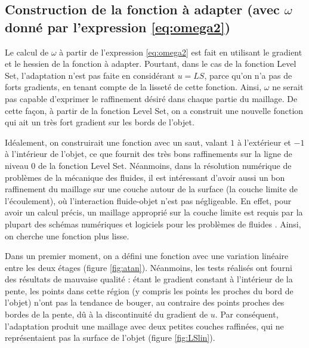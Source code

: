 \subsection{Construction de la fonction à adapter (avec \(\omega\) donné par l'expression \eqref{eq:omega2})}

\indent Le calcul de \(\omega\) à partir de l'expression \eqref{eq:omega2} est fait en utilisant le gradient et le hessien de la fonction à adapter. Pourtant, dans le cas de la fonction Level Set, l'adaptation n'est pas faite en considérant \(u=LS\), parce qu'on n'a pas de forts gradients, en tenant compte de la lisseté de cette fonction. Ainsi, \(\omega\) ne serait pas capable d'exprimer le raffinement désiré dans chaque partie du maillage. De cette façon, à partir de la fonction Level Set, on a construit une nouvelle fonction qui ait un très fort gradient sur les bords de l'objet.

\indent Idéalement, on construirait une fonction avec un saut, valant \(1\) à l'extérieur et \(-1\) à l'intérieur de l'objet, ce que fournit des très bons raffinements sur la ligne de niveau 0 de la fonction Level Set. Néanmoins, dans la résolution numérique de problèmes de la mécanique des fluides, il est intéressant d'avoir aussi un bon raffinement du maillage sur une couche autour de la surface (la couche limite de l'écoulement), où l'interaction fluide-objet n'est pas négligeable. En effet, pour avoir un calcul précis, un maillage approprié sur la couche limite est requis par la plupart des schémas numériques et logiciels pour les problèmes de fluides \cite{loseille}. Ainsi, on cherche une fonction plus lisse.

\indent Dans un premier moment, on a défini une fonction avec une variation linéaire entre les deux étages (figure \ref{fig:atan}). Néanmoins, les tests réalisés ont fourni des résultats de mauvaise qualité : étant le gradient constant à l'intérieur de la pente, les points dans cette région (y compris les points les proches du bord de l'objet) n'ont pas la tendance de bouger, au contraire des points proches des bordes de la pente, dû à la discontinuité du gradient de \(u\). Par conséquent, l'adaptation produit une maillage avec deux petites couches raffinées, qui ne représentaient pas la surface de l'objet (figure \ref{fig:LSlin}).

\indent

